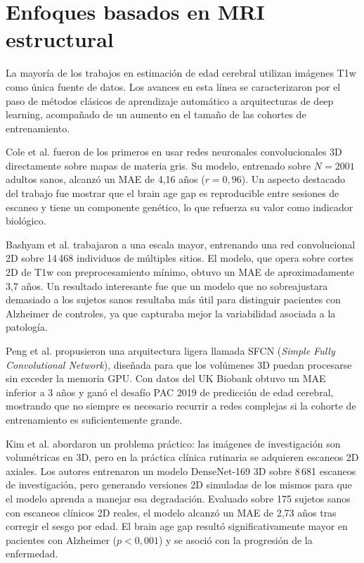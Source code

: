 \section{Enfoques basados en MRI estructural}

La mayoría de los trabajos en estimación de edad cerebral utilizan imágenes T1w como única fuente de datos. Los avances en esta línea se caracterizaron por el paso de métodos clásicos de aprendizaje automático a arquitecturas de deep learning, acompañado de un aumento en el tamaño de las cohortes de entrenamiento.

Cole et al. \cite{cole2017predicting} fueron de los primeros en usar redes neuronales convolucionales 3D directamente sobre mapas de materia gris. Su modelo, entrenado sobre $N = 2001$ adultos sanos, alcanzó un MAE de 4,16 años ($r = 0{,}96$). Un aspecto destacado del trabajo fue mostrar que el brain age gap es reproducible entre sesiones de escaneo y tiene un componente genético, lo que refuerza su valor como indicador biológico.

Bashyam et al. \cite{bashyam2020mri} trabajaron a una escala mayor, entrenando una red convolucional 2D sobre 14\,468 individuos de múltiples sitios. El modelo, que opera sobre cortes 2D de T1w con preprocesamiento mínimo, obtuvo un MAE de aproximadamente 3,7 años. Un resultado interesante fue que un modelo que no sobreajustara demasiado a los sujetos sanos resultaba más útil para distinguir pacientes con Alzheimer de controles, ya que capturaba mejor la variabilidad asociada a la patología.

Peng et al. \cite{peng2021accurate} propusieron una arquitectura ligera llamada SFCN (\textit{Simple Fully Convolutional Network}), diseñada para que los volúmenes 3D puedan procesarse sin exceder la memoria GPU. Con datos del UK Biobank obtuvo un MAE inferior a 3 años y ganó el desafío PAC 2019 de predicción de edad cerebral, mostrando que no siempre es necesario recurrir a redes complejas si la cohorte de entrenamiento es suficientemente grande.

Kim et al. \cite{kim2025novel} abordaron un problema práctico: las imágenes de investigación son volumétricas en 3D, pero en la práctica clínica rutinaria se adquieren escaneos 2D axiales. Los autores entrenaron un modelo DenseNet-169 3D sobre 8\,681 escaneos de investigación, pero generando versiones 2D simuladas de los mismos para que el modelo aprenda a manejar esa degradación. Evaluado sobre 175 sujetos sanos con escaneos clínicos 2D reales, el modelo alcanzó un MAE de 2,73 años tras corregir el sesgo por edad. El brain age gap resultó significativamente mayor en pacientes con Alzheimer ($p < 0{,}001$) y se asoció con la progresión de la enfermedad.

